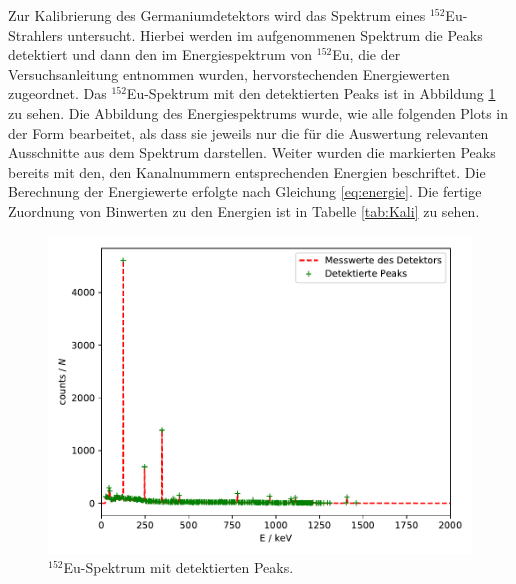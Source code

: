 Zur Kalibrierung des Germaniumdetektors wird das Spektrum eines $^{152}$Eu-Strahlers untersucht. Hierbei
werden im aufgenommenen Spektrum die Peaks detektiert und dann den im Energiespektrum von $^{152}$Eu, die der
Versuchsanleitung \cite{Q1} entnommen wurden, hervorstechenden Energiewerten zugeordnet. Das
$^{152}$Eu-Spektrum mit den detektierten Peaks ist in
Abbildung \ref{abb:Europiumspektrum} zu sehen. Die Abbildung des
Energiespektrums wurde, wie alle folgenden Plots in der Form bearbeitet, als
dass sie jeweils nur die für die Auswertung relevanten Ausschnitte aus dem
Spektrum darstellen. Weiter wurden die markierten Peaks bereits mit den, den
Kanalnummern entsprechenden Energien beschriftet. Die Berechnung der
Energiewerte erfolgte nach Gleichung \ref{eq:energie}.
Die fertige Zuordnung von Binwerten zu den Energien ist in Tabelle
\ref{tab:Kali} zu sehen.
\FloatBarrier
\begin{figure}
    \centering
    \includegraphics[scale=0.7]{Detektormesswerte.pdf}
    \caption{$^{152}$Eu-Spektrum mit detektierten Peaks.}
    \label{abb:Europiumspektrum}
\end{figure}
\FloatBarrier


